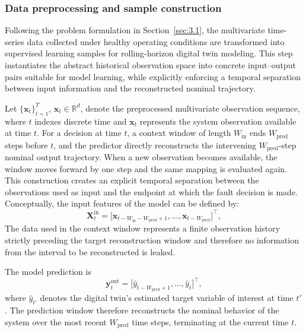 \documentclass[a4paper,10pt]{cas-sc}%
\newcommand{\rev}[1]{\textcolor{revisionred}{#1}}
\begin{document}
\subsubsection{Data preprocessing and sample construction}\label{sec3.2.2}

Following the problem formulation in Section~\ref{sec:3.1}, the multivariate time-series data collected under healthy operating conditions are transformed into supervised learning samples for rolling-horizon digital twin modeling. This step instantiates the abstract historical observation space into concrete input--output pairs suitable for model learning, while explicitly enforcing a temporal separation between input information and the reconstructed nominal trajectory.

Let $\{\boldsymbol{x}_t\}_{t=1}^{T}$, $\boldsymbol{x}_t \in \mathbb{R}^d$, denote the preprocessed multivariate observation sequence, where $t$ indexes discrete time and $\boldsymbol{x}_t$ represents the system observation available at time $t$. \rev{For a decision at time $t$, a context window of length $W_{\mathrm{in}}$ ends $W_{\mathrm{pred}}$ steps before $t$, and the predictor directly reconstructs the intervening $W_{\mathrm{pred}}$-step nominal output trajectory. When a new observation becomes available, the window moves forward by one step and the same mapping is evaluated again. This construction creates an explicit temporal separation between the observations used as input and the endpoint at which the fault decision is made.} Conceptually, the input features of the model can be defined by:
\begin{equation}
	\boldsymbol{X}_t^{\mathrm{in}}
	=
	\big[
	\boldsymbol{x}_{t-W_{\mathrm{in}}-W_{\mathrm{pred}}+1},
	\ldots,
	\boldsymbol{x}_{t-W_{\mathrm{pred}}}
	\big]^\top ,
	\label{eq:input_features}
\end{equation}
The data used in the context window represents a finite observation history strictly preceding the target reconstruction window and therefore no information from the interval to be reconstructed is leaked.

The model prediction is
\begin{equation}
	\boldsymbol{y}_t^{\mathrm{out}}
	=
	\big[
	\hat{y}_{t-W_{\mathrm{pred}}+1},
	\ldots,
	\hat{y}_t
	\big]^\top,
	\label{eq:output_features}
\end{equation}
where $\hat{y}_{t'}$ denotes the digital twin's estimated target variable of interest at time $t'$. The prediction window therefore reconstructs the nominal behavior of the system over the most recent $W_{\mathrm{pred}}$ time steps, terminating at the current time $t$.
\end{document}
